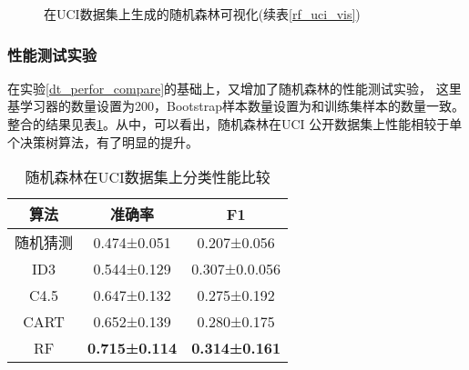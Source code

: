 \documentclass[main.tex]{subfiles}
\begin{document}
\begin{figure}[htbp!]
    \centering 
    \quad
    \quad
    \quad
    \caption{在UCI数据集上生成的随机森林可视化(续表\ref{rf_uci_vis})}
    \label{rf_uci_vis_2}
\end{figure}

\subsubsection{性能测试实验}
在实验\ref{dt_perfor_compare}的基础上，又增加了随机森林的性能测试实验，
这里基学习器的数量设置为200，Bootstrap样本数量设置为和训练集样本的数量一致。
整合的结果见表\ref{rf_perfor_compare}。从中，可以看出，随机森林在UCI
公开数据集上性能相较于单个决策树算法，有了明显的提升。

\begin{table}[]
    \caption{随机森林在UCI数据集上分类性能比较}
    \label{rf_perfor_compare}
    \centering
    \begin{tabular}{ccc}
    \hline
    算法   & 准确率                  & F1                   \\ \hline
    随机猜测 & 0.474±0.051          & 0.207±0.056 \\ \hline
    ID3  & 0.544±0.129          & 0.307±0.0.056         \\
    C4.5 & 0.647±0.132          & 0.275±0.192          \\
    CART & 0.652±0.139  & 0.280±0.175    \\ \hline
    RF   & \textbf{0.715±0.114}   & \textbf{0.314±0.161}    \\ \hline
    \end{tabular}
\end{table}
\end{document}

